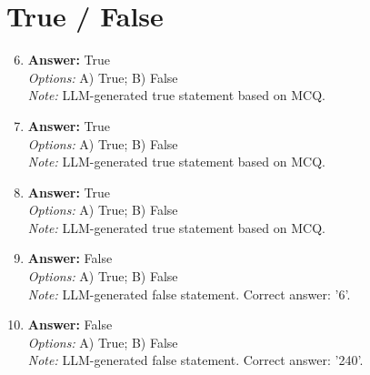 \documentclass[12pt]{article}
\begin{document}
\section*{True / False}
\begin{enumerate}[label=\arabic*.]
\setcounter{enumi}{5}
\item \textbf{Answer:} True
\\ \textit{Options:} A) True; B) False
\\ \textit{Note:} LLM-generated true statement based on MCQ.
\item \textbf{Answer:} True
\\ \textit{Options:} A) True; B) False
\\ \textit{Note:} LLM-generated true statement based on MCQ.
\item \textbf{Answer:} True
\\ \textit{Options:} A) True; B) False
\\ \textit{Note:} LLM-generated true statement based on MCQ.
\item \textbf{Answer:} False
\\ \textit{Options:} A) True; B) False
\\ \textit{Note:} LLM-generated false statement. Correct answer: '6'.
\item \textbf{Answer:} False
\\ \textit{Options:} A) True; B) False
\\ \textit{Note:} LLM-generated false statement. Correct answer: '240'.
\end{enumerate}
\end{document}
